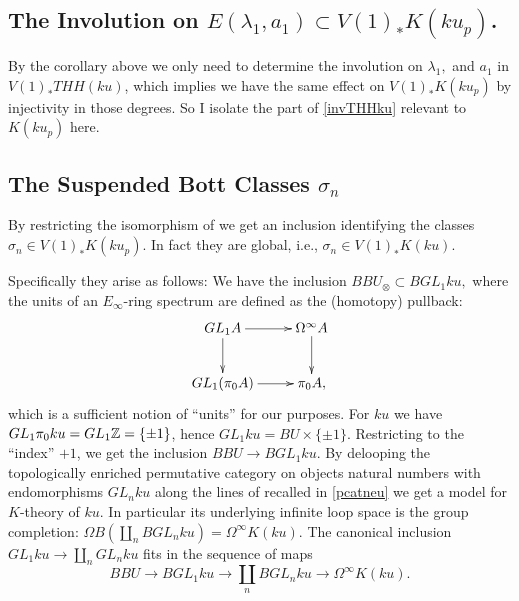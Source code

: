 \subsection{The Involution on $E(\lambda_1,a_1)\subset V(1)_*K(ku_p)$.}
By the corollary above we only need to determine the involution on 
$\lambda_1,$ and $a_1$ in $V(1)_*THH(ku)$, which implies we have
the same effect on $V(1)_*K(ku_p)$ by injectivity in those degrees.
So I isolate the part of \ref{invTHHku} relevant to $K(ku_p)$ here.

{}

{}

\subsection{The Suspended Bott Classes $\sigma_n$}
By restricting the isomorphism of \cite[Proposition 5.2]{AuKku} we get
an inclusion identifying the classes $\sigma_n\in V(1)_*K(ku_p).$ In fact
they are global, i.e., $\sigma_n\in V(1)_*K(ku).$

Specifically they arise as follows: We have the inclusion 
$BBU_\otimes\subset BGL_1ku,$ where the units of an $E_\infty$-ring spectrum
are defined as the (homotopy) pullback:
\[\xymatrix{
GL_1A\ar[r]\ar[d]&\Omega^\infty A\ar[d]\\
GL_1(\pi_0A)\ar[r]&\pi_0A,}\]
which is a sufficient notion of ``units'' for our purposes. For $ku$ we have
$GL_1\pi_0ku= GL_1\mathbb{Z}=\{\pm 1\}$, hence $GL_1ku=BU\times\{\pm1\}.$
Restricting to the ``index'' $+1$, we get the
inclusion $BBU\rightarrow BGL_1ku$. By delooping the
topologically enriched permutative category on objects natural
numbers with endomorphisms $GL_nku$ along the lines of \cite{EM}
recalled in \ref{pcatneu} we get a model for $K$-theory of $ku$.
In particular its underlying infinite loop space is the group completion:
$\Omega B(\coprod_nBGL_nku)=\Omega^\infty K(ku).$ The canonical
inclusion $GL_1ku\rightarrow \coprod_nGL_nku$ fits in the
sequence of maps
\[BBU\rightarrow BGL_1ku\rightarrow \coprod_nBGL_nku\rightarrow 
\Omega^\infty K(ku).\]

